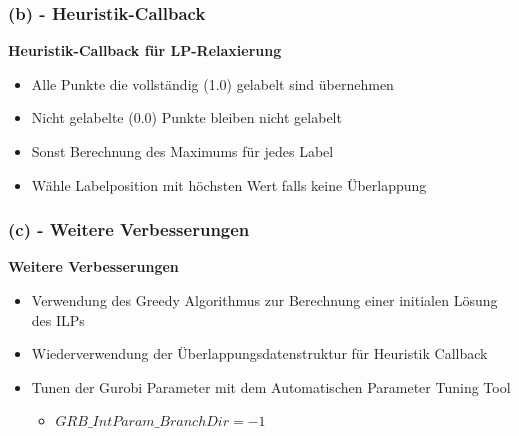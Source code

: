 \documentclass[aspectratio=169]{beamer}
\begin{document}
\begin{frame}
\frametitle{(b) - Heuristik-Callback}
\textbf{Heuristik-Callback für LP-Relaxierung}

\begin{itemize}
	\item Alle Punkte die vollständig (1.0) gelabelt sind übernehmen
	\item Nicht gelabelte (0.0) Punkte bleiben nicht gelabelt
	\item Sonst Berechnung des Maximums für jedes Label
	\item Wähle Labelposition mit höchsten Wert falls keine Überlappung
\end{itemize}

\end{frame}

\begin{frame}
\frametitle{(c) - Weitere Verbesserungen}
\textbf{Weitere Verbesserungen}

\begin{itemize}
	\item Verwendung des Greedy Algorithmus zur Berechnung einer initialen Lösung des ILPs
	\item Wiederverwendung der Überlappungsdatenstruktur für Heuristik Callback
	\item Tunen der Gurobi Parameter mit dem Automatischen Parameter Tuning Tool
		\begin{itemize}
			\item $GRB\_IntParam\_BranchDir = -1$
		\end{itemize}
	
\end{itemize}

\end{frame}
\end{document}
